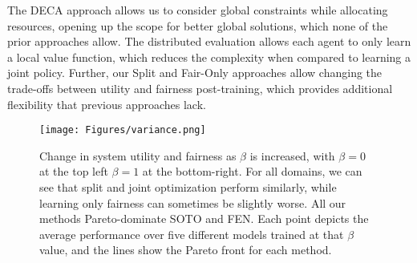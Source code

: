 The DECA approach allows us to consider global constraints while allocating resources, opening up the scope for better global solutions, which none of the prior approaches allow. The distributed evaluation allows each agent to only learn a local value function, which reduces the complexity when compared to learning a joint policy. Further, our Split and Fair-Only approaches allow changing the trade-offs between utility and fairness post-training, which provides additional flexibility that previous approaches lack. 




\begin{figure*}[ht]
    \centering
    \texttt{[image: Figures/variance.png]}
    \caption{Change in system utility and fairness as $\beta$ is increased, with $\beta=0$ at the top left $\beta=1$ at the bottom-right. For all domains, we can see that split and joint optimization perform similarly, while learning only fairness can sometimes be slightly worse. All our methods Pareto-dominate SOTO and FEN. Each point depicts the average performance over five different models trained at that $\beta$ value, and the lines show the Pareto front for each method.}
    \label{fig:main_results}
\end{figure*}